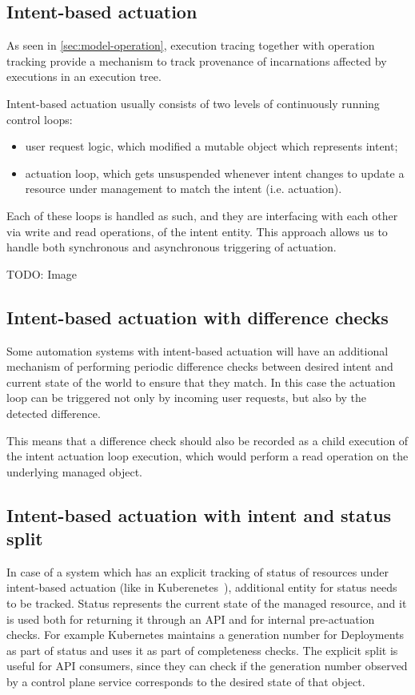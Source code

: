 \subsection{Intent-based actuation}

As seen in \cref{sec:model-operation}, execution tracing together with operation tracking provide a mechanism to track provenance of incarnations affected by executions in an execution tree. 

Intent-based actuation usually consists of two levels of continuously running control loops:
%
\begin{itemize}
	\item user request logic, which modified a mutable object which represents intent;
	\item actuation loop, which gets unsuspended whenever intent changes to update a resource under management to match the intent (i.e. actuation).
\end{itemize}

Each of these loops is handled as such, and they are interfacing with each other via write and read operations, of the intent entity. This approach allows us to handle both synchronous and asynchronous triggering of actuation.

TODO: Image\todo{!}

\subsection{Intent-based actuation with difference checks}

Some automation systems with intent-based actuation will have an additional mechanism of performing periodic difference checks between desired intent and current state of the world to ensure that they match. In this case the actuation loop can be triggered not only by incoming user requests, but also by the detected difference.

This means that a difference check should also be recorded as a child execution of the intent actuation loop execution, which would perform a read operation on the underlying managed object.


\subsection{Intent-based actuation with intent and status split}\label{sec:intent-with-split}

In case of a system which has an explicit tracking of status of resources under intent-based actuation (like in Kuberenetes~\cite{k8sObjects2020}), additional entity for status needs to be tracked. Status represents the current state of the managed resource, and it is used both for returning it through an API and for internal pre-actuation checks. For example Kubernetes maintains a generation number for Deployments as part of status and uses it as part of completeness checks. The explicit split is useful for API consumers, since they can check if the generation number observed by a control plane service corresponds to the desired state of that object.

